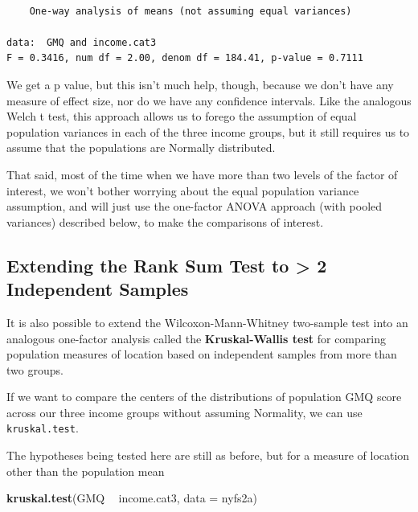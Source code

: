 \documentclass[
]{book}
\newenvironment{Shaded}{\begin{snugshade}}{\end{snugshade}}
\newcommand{\DataTypeTok}[1]{\textcolor[rgb]{0.13,0.29,0.53}{#1}}
\newcommand{\KeywordTok}[1]{\textcolor[rgb]{0.13,0.29,0.53}{\textbf{#1}}}
\newcommand{\NormalTok}[1]{#1}
\newcommand{\OperatorTok}[1]{\textcolor[rgb]{0.81,0.36,0.00}{\textbf{#1}}}
\newcommand{\StringTok}[1]{\textcolor[rgb]{0.31,0.60,0.02}{#1}}
\begin{document}
\begin{verbatim}

	One-way analysis of means (not assuming equal variances)

data:  GMQ and income.cat3
F = 0.3416, num df = 2.00, denom df = 184.41, p-value = 0.7111
\end{verbatim}

We get a p value, but this isn't much help, though, because we don't have any measure of effect size, nor do we have any confidence intervals. Like the analogous Welch t test, this approach allows us to forego the assumption of equal population variances in each of the three income groups, but it still requires us to assume that the populations are Normally distributed.

That said, most of the time when we have more than two levels of the factor of interest, we won't bother worrying about the equal population variance assumption, and will just use the one-factor ANOVA approach (with pooled variances) described below, to make the comparisons of interest.

\hypertarget{extending-the-rank-sum-test-to-2-independent-samples}{%
\subsection{Extending the Rank Sum Test to \textgreater{} 2 Independent Samples}\label{extending-the-rank-sum-test-to-2-independent-samples}}

It is also possible to extend the Wilcoxon-Mann-Whitney two-sample test into an analogous one-factor analysis called the \textbf{Kruskal-Wallis test} for comparing population measures of location based on independent samples from more than two groups.

If we want to compare the centers of the distributions of population GMQ score across our three income groups without assuming Normality, we can use \texttt{kruskal.test}.

The hypotheses being tested here are still as before, but for a measure of location other than the population mean

\begin{Shaded}
\begin{Highlighting}[]
\KeywordTok{kruskal.test}\NormalTok{(GMQ }\OperatorTok{~}\StringTok{ }\NormalTok{income.cat3, }\DataTypeTok{data =}\NormalTok{ nyfs2a)}
\end{Highlighting}
\end{Shaded}
\end{document}
